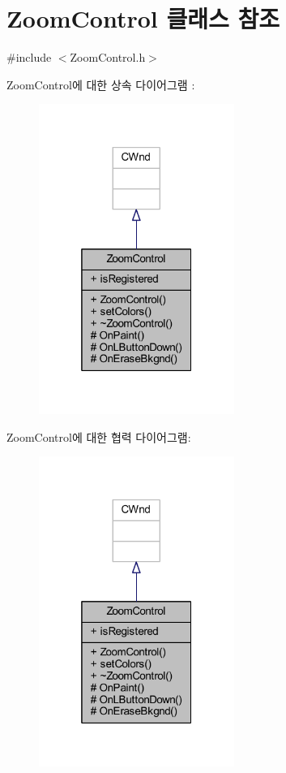 \hypertarget{class_zoom_control}{}\section{Zoom\+Control 클래스 참조}
\label{class_zoom_control}


{\ttfamily \#include $<$Zoom\+Control.\+h$>$}



Zoom\+Control에 대한 상속 다이어그램 \+: \nopagebreak
\begin{figure}[H]
\begin{center}
\leavevmode
\includegraphics[width=181pt]{class_zoom_control__inherit__graph}
\end{center}
\end{figure}


Zoom\+Control에 대한 협력 다이어그램\+:\nopagebreak
\begin{figure}[H]
\begin{center}
\leavevmode
\includegraphics[width=181pt]{class_zoom_control__coll__graph}
\end{center}
\end{figure}
